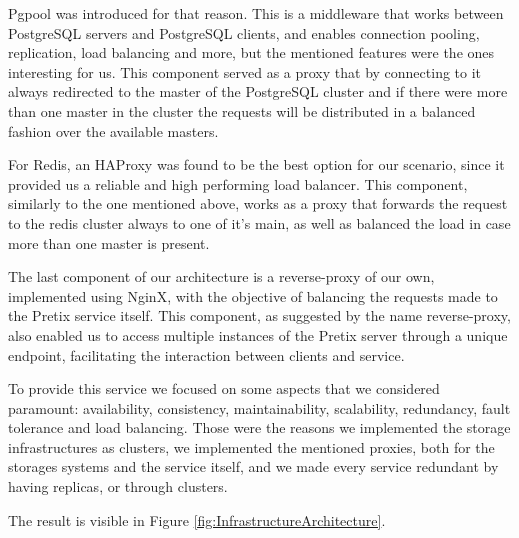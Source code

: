 \documentclass[12pt]{article}
\begin{document}
Pgpool \cite{pgpool} was introduced for that reason. This is a middleware that works between PostgreSQL servers and PostgreSQL clients, and enables connection pooling, replication, load balancing and more, but the mentioned features were the ones interesting for us.
This component served as a proxy that by connecting to it always redirected to the master of the PostgreSQL cluster and if there were more than one master in the cluster the requests will be distributed in a balanced fashion over the available masters. 

For Redis, an HAProxy \cite{haproxy} was found to be the best option for our scenario, since it provided us a reliable and high performing load balancer. This component, similarly to the one mentioned above, works as a proxy that forwards the request to the redis cluster always to one of it's main, as well as balanced the load in case more than one master is present.

The last component of our architecture is a reverse-proxy of our own, implemented using NginX, with the objective of balancing the requests made to the Pretix service itself. This component, as suggested by the name reverse-proxy, also enabled us to access multiple instances of the Pretix server through a unique endpoint, facilitating the interaction between clients and service.

To provide this service we focused on some aspects that we considered paramount: availability, consistency, maintainability, scalability, redundancy, fault tolerance and load balancing. Those were the reasons we implemented the storage infrastructures as clusters, we implemented the mentioned proxies, both for the storages systems and the service itself, and we made every service redundant by having replicas, or through clusters.

The result is visible in Figure \ref{fig:InfrastructureArchitecture}.
\end{document}
